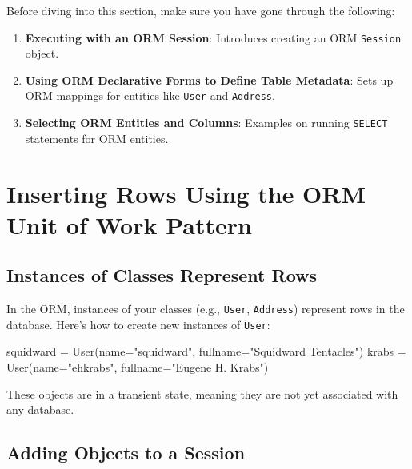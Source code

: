 \documentclass[
  letterpaper,
  DIV=11,
  numbers=noendperiod]{scrreprt}
\newenvironment{Shaded}{\begin{snugshade}}{\end{snugshade}}
\newcommand{\NormalTok}[1]{\textcolor[rgb]{0.00,0.23,0.31}{#1}}
\newcommand{\OperatorTok}[1]{\textcolor[rgb]{0.37,0.37,0.37}{#1}}
\newcommand{\StringTok}[1]{\textcolor[rgb]{0.13,0.47,0.30}{#1}}
\providecommand{\tightlist}{%
  \setlength{\itemsep}{0pt}\setlength{\parskip}{0pt}}\usepackage{longtable,booktabs,array}
\begin{document}
Before diving into this section, make sure you have gone through the
following:

\begin{enumerate}
\def\labelenumi{\arabic{enumi}.}
\tightlist
\item
  \textbf{Executing with an ORM Session}: Introduces creating an ORM
  \texttt{Session} object.
\item
  \textbf{Using ORM Declarative Forms to Define Table Metadata}: Sets up
  ORM mappings for entities like \texttt{User} and \texttt{Address}.
\item
  \textbf{Selecting ORM Entities and Columns}: Examples on running
  \texttt{SELECT} statements for ORM entities.
\end{enumerate}

\section{Inserting Rows Using the ORM Unit of Work
Pattern}\label{inserting-rows-using-the-orm-unit-of-work-pattern}

\subsection{Instances of Classes Represent
Rows}\label{instances-of-classes-represent-rows}

In the ORM, instances of your classes (e.g., \texttt{User},
\texttt{Address}) represent rows in the database. Here's how to create
new instances of \texttt{User}:

\begin{Shaded}
\begin{Highlighting}[]
\NormalTok{squidward }\OperatorTok{=}\NormalTok{ User(name}\OperatorTok{=}\StringTok{"squidward"}\NormalTok{, fullname}\OperatorTok{=}\StringTok{"Squidward Tentacles"}\NormalTok{)}
\NormalTok{krabs }\OperatorTok{=}\NormalTok{ User(name}\OperatorTok{=}\StringTok{"ehkrabs"}\NormalTok{, fullname}\OperatorTok{=}\StringTok{"Eugene H. Krabs"}\NormalTok{)}
\end{Highlighting}
\end{Shaded}

These objects are in a transient state, meaning they are not yet
associated with any database.

\subsection{Adding Objects to a
Session}\label{adding-objects-to-a-session}
\end{document}
